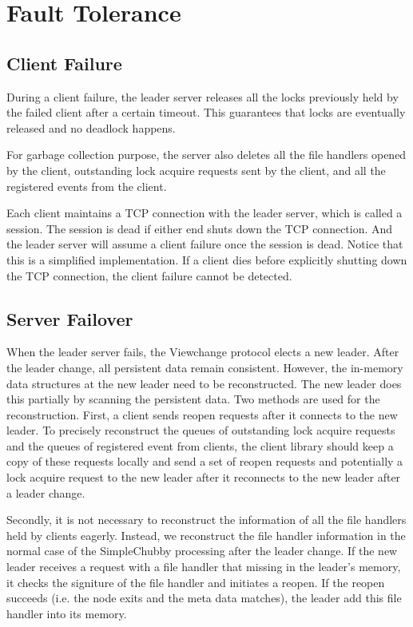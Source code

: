 \section{Fault Tolerance}
\label{section:failure}

\subsection{Client Failure}

During a client failure, the leader server releases all the locks
previously held by the failed client after a certain timeout.
This guarantees that locks are eventually released and no deadlock happens.

For garbage collection
purpose, the server also deletes all the file handlers opened by the client,
outstanding lock acquire requests sent by the client, and all the registered
events from the client.

Each client maintains a TCP connection with the leader server,
which is called a session.
The session is dead if either end shuts down the TCP connection.
And the leader server will assume a client failure once the session is dead.
Notice that this is a simplified implementation.
If a client dies before explicitly shutting down the TCP connection,
the client failure cannot be detected.

\subsection{Server Failover}

When the leader server fails, the Viewchange protocol elects a new leader. After
the leader change, all persistent data remain consistent. However, the in-memory
data structures at the new leader need to be reconstructed. The new leader
does this partially by scanning the persistent data. 
Two methods are used for the reconstruction.
First, a client sends reopen requests after it connects to the new leader.
To precisely reconstruct the queues of outstanding lock acquire requests and
the queues of registered event from clients, the client library should keep
a copy of these requests locally and send a set of reopen requests and
potentially a lock acquire request to the new leader after it reconnects
to the new leader after a leader change.

Secondly, it is not necessary to reconstruct the information of all the file
handlers held by clients eagerly. Instead, we reconstruct the file handler
information in the normal case of the SimpleChubby processing after the
leader change. If the new leader receives a request with a file handler that
missing in the leader's memory, it checks the signiture of the file
handler and initiates a reopen. If the reopen succeeds (i.e. the node exits
and the meta data matches), the leader add this file handler into its memory.
